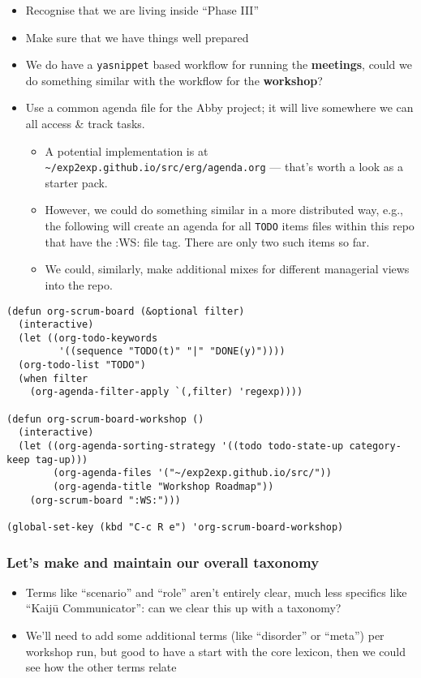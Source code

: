 \documentclass[11pt]{article}
\begin{document}
\begin{itemize}
\item Recognise that we are living inside ``Phase III''
\item Make sure that we have things well prepared
\item We do have a \texttt{yasnippet} based workflow for running the \textbf{meetings}, could we do something similar with the workflow for the \textbf{workshop}?
\item Use a common agenda file for the Abby project; it will live somewhere we can all access \& track tasks.
\begin{itemize}
\item A potential implementation is at \texttt{\textasciitilde{}/exp2exp.github.io/src/erg/agenda.org} — that’s worth a look as a starter pack.
\item However, we could do something similar in a more distributed way, e.g., the following will create an agenda for all \texttt{TODO} items files within this repo that have the :WS: file tag.  There are only two such items so far.
\item We could, similarly, make additional mixes for different managerial views into the repo.
\end{itemize}
\end{itemize}

\begin{verbatim}
(defun org-scrum-board (&optional filter)
  (interactive)
  (let ((org-todo-keywords
         '((sequence "TODO(t)" "|" "DONE(y)"))))
  (org-todo-list "TODO")
  (when filter
    (org-agenda-filter-apply `(,filter) 'regexp))))

(defun org-scrum-board-workshop ()
  (interactive)
  (let ((org-agenda-sorting-strategy '((todo todo-state-up category-keep tag-up)))
        (org-agenda-files '("~/exp2exp.github.io/src/"))
        (org-agenda-title "Workshop Roadmap"))
    (org-scrum-board ":WS:")))

(global-set-key (kbd "C-c R e") 'org-scrum-board-workshop)
\end{verbatim}

\subsubsection{Let’s make and maintain our overall taxonomy}
\label{sec:org243fcde}

\begin{itemize}
\item Terms like “scenario” and “role” aren’t entirely clear, much less specifics like “Kaijū Communicator”: can we clear this up with a taxonomy?
\item We’ll need to add some additional terms (like “disorder” or “meta”) per workshop run, but good to have a start with the core lexicon, then we could see how the other terms relate
\end{itemize}
\end{document}
